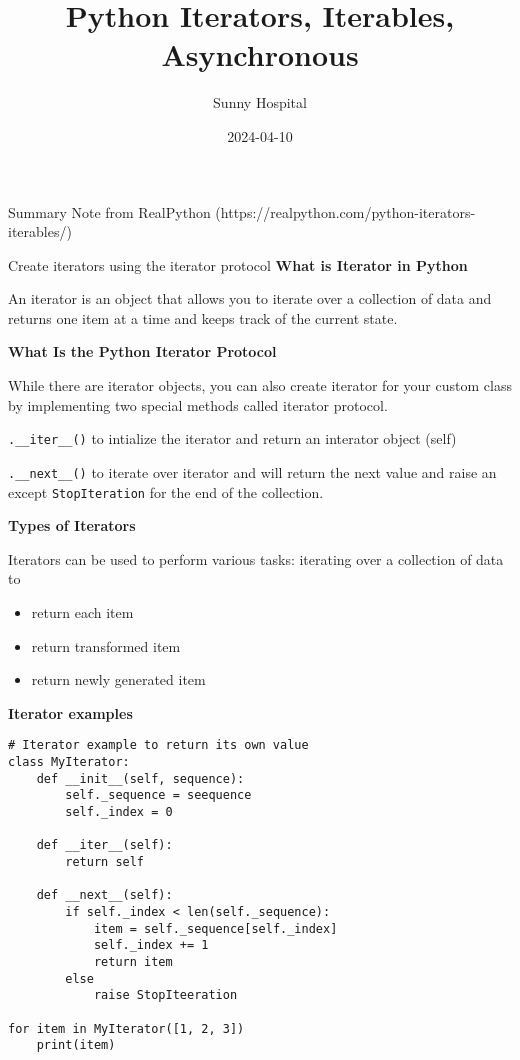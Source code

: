 \documentclass[
  ignorenonframetext,
]{beamer}
\title{Python Iterators, Iterables, Asynchronous}
\author{Sunny Hospital}
\date{2024-04-10}
\providecommand{\tightlist}{%
  \setlength{\itemsep}{0pt}\setlength{\parskip}{0pt}}\usepackage{longtable,booktabs,array}
\begin{document}
\frame{\titlepage}

\begin{frame}
Summary Note from RealPython
(https://realpython.com/python-iterators-iterables/)
\end{frame}

\begin{frame}[fragile]{Create iterators using the iterator protocol}
\label{create-iterators-using-the-iterator-protocol}
\textbf{What is Iterator in Python}

An iterator is an object that allows you to iterate over a collection of
data and returns one item at a time and keeps track of the current
state.

\textbf{What Is the Python Iterator Protocol}

While there are iterator objects, you can also create iterator for your
custom class by implementing two special methods called iterator
protocol.

\texttt{.\_\_iter\_\_()} to intialize the iterator and return an
interator object (self)

\texttt{.\_\_next\_\_()} to iterate over iterator and will return the
next value and raise an except \texttt{StopIteration} for the end of the
collection.

\textbf{Types of Iterators}

Iterators can be used to perform various tasks: iterating over a
collection of data to

\begin{itemize}
\tightlist
\item
  return each item
\item
  return transformed item
\item
  return newly generated item
\end{itemize}

\textbf{Iterator examples}

\begin{verbatim}
# Iterator example to return its own value
class MyIterator:
    def __init__(self, sequence):
        self._sequence = seequence
        self._index = 0

    def __iter__(self):
        return self 

    def __next__(self):
        if self._index < len(self._sequence):
            item = self._sequence[self._index]
            self._index += 1
            return item
        else 
            raise StopIteeration 

for item in MyIterator([1, 2, 3])
    print(item)
\end{verbatim}


\end{frame}
\end{document}
